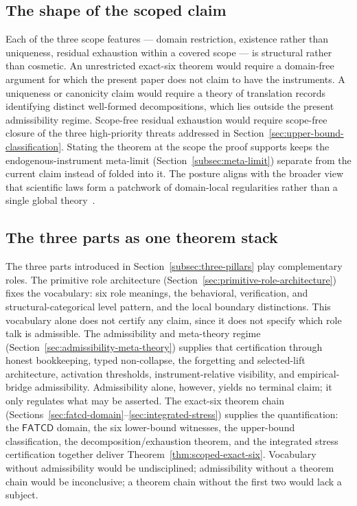 \documentclass[11pt]{article}
\theoremstyle{definition}
\newcommand{\FATCD}{\ensuremath{\mathsf{FATCD}}}
\begin{document}
\subsection{The shape of the scoped claim}\label{subsec:discussion-shape}

Each of the three scope features --- domain restriction, existence
rather than uniqueness, residual exhaustion within a covered scope
--- is structural rather than cosmetic. An unrestricted exact-six
theorem would require a domain-free argument for which the present
paper does not claim to have the instruments. A uniqueness or
canonicity claim would require a theory of translation records
identifying distinct well-formed decompositions, which lies outside
the present admissibility regime. Scope-free residual exhaustion
would require scope-free closure of the three high-priority threats
addressed in Section~\ref{sec:upper-bound-classification}. Stating
the theorem at the scope the proof supports keeps the
endogenous-instrument meta-limit (Section~\ref{subsec:meta-limit})
separate from the current claim instead of folded into it. The posture
aligns with the broader view that scientific laws form a patchwork of
domain-local regularities rather than a single global
theory~\citep{Cartwright1999}.

\subsection{The three parts as one theorem stack}\label{subsec:discussion-pillars}

The three parts introduced in Section~\ref{subsec:three-pillars} play
complementary roles. The primitive role architecture
(Section~\ref{sec:primitive-role-architecture}) fixes the vocabulary:
six role meanings, the behavioral, verification, and
structural-categorical level pattern, and the local boundary
distinctions. This vocabulary alone does not certify any claim,
since it does not specify which role talk is admissible. The
admissibility and meta-theory regime
(Section~\ref{sec:admissibility-meta-theory}) supplies that
certification through honest bookkeeping, typed non-collapse, the
forgetting and selected-lift architecture, activation thresholds,
instrument-relative visibility, and empirical-bridge admissibility.
Admissibility alone, however, yields no terminal claim; it only
regulates what may be asserted. The exact-six theorem chain
(Sections~\ref{sec:fatcd-domain}--\ref{sec:integrated-stress})
supplies the quantification: the \FATCD{} domain, the six
lower-bound witnesses, the upper-bound classification, the
decomposition/exhaustion theorem, and the integrated stress
certification together deliver Theorem~\ref{thm:scoped-exact-six}.
Vocabulary without admissibility would be undisciplined; admissibility
without a theorem chain would be inconclusive; a theorem chain without
the first two would lack a subject.
\end{document}
